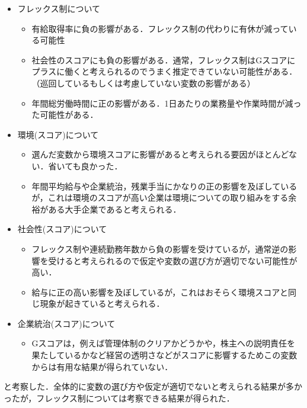 \documentclass[a4j,uplatex]{jsarticle}
\theoremstyle{definition}
\begin{document}
\begin{itemize}
    \item フレックス制について
          \begin{itemize}
              \item 有給取得率に負の影響がある．フレックス制の代わりに有休が減っている可能性
              \item 社会性のスコアにも負の影響がある．通常，フレックス制はGスコアにプラスに働くと考えられるのでうまく推定できていない可能性がある．（巡回しているもしくは考慮していない変数の影響がある）
              \item 年間総労働時間に正の影響がある．1日あたりの業務量や作業時間が減った可能性がある．
          \end{itemize}
    \item 環境(スコア)について
          \begin{itemize}
              \item 選んだ変数から環境スコアに影響があると考えられる要因がほとんどない．省いても良かった．
              \item 年間平均給与や企業統治，残業手当にかなりの正の影響を及ぼしているが，これは環境のスコアが高い企業は環境についての取り組みをする余裕がある大手企業であると考えられる．
          \end{itemize}
    \item 社会性(スコア)について
          \begin{itemize}
              \item フレックス制や連続勤務年数から負の影響を受けているが，通常逆の影響を受けると考えられるので仮定や変数の選び方が適切でない可能性が高い．
              \item 給与に正の高い影響を及ぼしているが，これはおそらく環境スコアと同じ現象が起きていると考えられる．
          \end{itemize}
    \item 企業統治(スコア)について
          \begin{itemize}
              \item Gスコアは，例えば管理体制のクリアかどうかや，株主への説明責任を果たしているかなど経営の透明さなどがスコアに影響するためこの変数からは有用な結果が得られていない．
          \end{itemize}
\end{itemize}

と考察した．全体的に変数の選び方や仮定が適切でないと考えられる結果が多かったが，フレックス制については考察できる結果が得られた．
\end{document}
